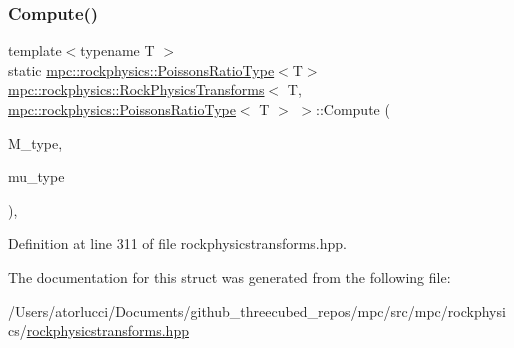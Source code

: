 \subsubsection{\texorpdfstring{Compute()}{Compute()}\hspace{0.1cm}{\footnotesize\ttfamily [6/6]}}
{\footnotesize\ttfamily template$<$typename T $>$ \\
static \mbox{\hyperlink{structmpc_1_1rockphysics_1_1_poissons_ratio_type}{mpc\+::rockphysics\+::\+Poissons\+Ratio\+Type}}$<$T$>$ \mbox{\hyperlink{structmpc_1_1rockphysics_1_1_rock_physics_transforms}{mpc\+::rockphysics\+::\+Rock\+Physics\+Transforms}}$<$ T, \mbox{\hyperlink{structmpc_1_1rockphysics_1_1_poissons_ratio_type}{mpc\+::rockphysics\+::\+Poissons\+Ratio\+Type}}$<$ T $>$ $>$\+::Compute (\begin{DoxyParamCaption}\item[{const \mbox{\hyperlink{structmpc_1_1rockphysics_1_1_compressional_modulus_type}{mpc\+::rockphysics\+::\+Compressional\+Modulus\+Type}}$<$ T $>$ \&}]{M\+\_\+type,  }\item[{const \mbox{\hyperlink{structmpc_1_1rockphysics_1_1_shear_modulus_type}{mpc\+::rockphysics\+::\+Shear\+Modulus\+Type}}$<$ T $>$ \&}]{mu\+\_\+type }\end{DoxyParamCaption})\hspace{0.3cm}{\ttfamily [inline]}, {\ttfamily [static]}}



Definition at line 311 of file rockphysicstransforms.\+hpp.



The documentation for this struct was generated from the following file\+:\begin{DoxyCompactItemize}
\item 
/\+Users/atorlucci/\+Documents/github\+\_\+threecubed\+\_\+repos/mpc/src/mpc/rockphysics/\mbox{\hyperlink{rockphysicstransforms_8hpp}{rockphysicstransforms.\+hpp}}\end{DoxyCompactItemize}
